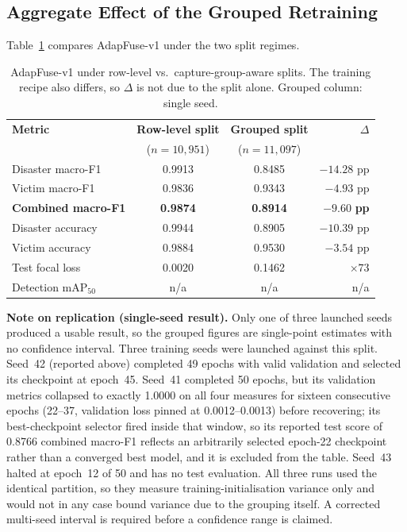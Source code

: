 \subsection{Aggregate Effect of the Grouped Retraining}

Table~\ref{tab:grouped_comparison} compares AdapFuse-v1 under the two split regimes.

\begin{table}[H]
\centering
\caption[Row-level vs.\ capture-group-aware split]{AdapFuse-v1 under row-level vs.\ capture-group-aware splits. The training recipe also differs, so $\Delta$ is not due to the split alone. Grouped column: single seed.}
\label{tab:grouped_comparison}
\begin{tabular}{@{}lccr@{}}
\toprule
\textbf{Metric} & \textbf{Row-level split} & \textbf{Grouped split} & \textbf{$\Delta$} \\
                & ($n=10{,}951$)          & ($n=11{,}097$)         &                    \\
\midrule
Disaster macro-F1   & 0.9913 & 0.8485 & $-14.28$ pp \\
Victim macro-F1     & 0.9836 & 0.9343 & $-4.93$ pp \\
\textbf{Combined macro-F1} & \textbf{0.9874} & \textbf{0.8914} & $\mathbf{-9.60}$ \textbf{pp} \\
Disaster accuracy   & 0.9944 & 0.8905 & $-10.39$ pp \\
Victim accuracy     & 0.9884 & 0.9530 & $-3.54$ pp \\
Test focal loss     & 0.0020 & 0.1462 & $\times 73$ \\
Detection $\mathrm{mAP}_{50}$ & n/a & n/a & n/a \\
\bottomrule
\end{tabular}

\vspace{2mm}
\parbox{\textwidth}{\footnotesize \textbf{Note on replication (single-seed result).} Only one of three launched seeds produced a usable result, so the grouped figures are single-point estimates with no confidence interval. Three training seeds were launched against this split. Seed~42 (reported above) completed 49 epochs with valid validation and selected its checkpoint at epoch~45. Seed~41 completed 50 epochs, but its validation metrics collapsed to exactly 1.0000 on all four measures for sixteen consecutive epochs (22--37, validation loss pinned at 0.0012--0.0013) before recovering; its best-checkpoint selector fired inside that window, so its reported test score of 0.8766 combined macro-F1 reflects an arbitrarily selected epoch-22 checkpoint rather than a converged best model, and it is excluded from the table. Seed~43 halted at epoch~12 of 50 and has no test evaluation. All three runs used the identical partition, so they measure training-initialisation variance only and would not in any case bound variance due to the grouping itself. A corrected multi-seed interval is required before a confidence range is claimed.}
\end{table}

